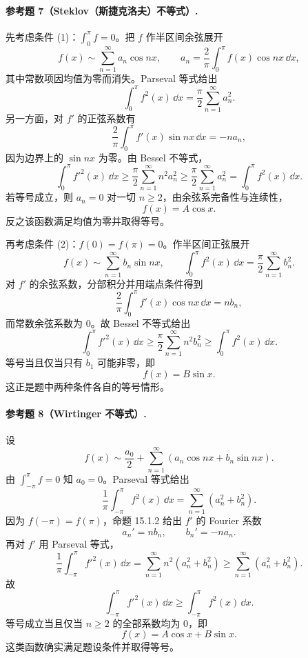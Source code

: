 \paragraph{参考题 7（Steklov（斯捷克洛夫）不等式）.}
\begin{xsolution}
先考虑条件 (1)：$\int_0^\pi f=0$。把 $f$ 作半区间余弦展开
\[
  f(x)\sim\sum_{n=1}^{\infty}a_n\cos nx,
\qquad
  a_n=\frac2\pi\int_0^\pi f(x)\cos nx\,\dd x,
\]
其中常数项因均值为零而消失。Parseval 等式给出
\[
  \int_0^\pi f^2(x)\,\dd x
  =\frac\pi2\sum_{n=1}^{\infty}a_n^2.
\]
另一方面，对 $f'$ 的正弦系数有
\[
  \frac2\pi\int_0^\pi f'(x)\sin nx\,\dd x
  =-n a_n,
\]
因为边界上的 $\sin nx$ 为零。由 Bessel 不等式，
\[
  \int_0^\pi f'^2(x)\,\dd x
  \ge\frac\pi2\sum_{n=1}^{\infty}n^2a_n^2
  \ge\frac\pi2\sum_{n=1}^{\infty}a_n^2
  =\int_0^\pi f^2(x)\,\dd x.
\]
若等号成立，则 $a_n=0$ 对一切 $n\ge2$，由余弦系完备性与连续性，
\[
  f(x)=A\cos x.
\]
反之该函数满足均值为零并取得等号。

再考虑条件 (2)：$f(0)=f(\pi)=0$。作半区间正弦展开
\[
  f(x)\sim\sum_{n=1}^{\infty}b_n\sin nx,
\qquad
  \int_0^\pi f^2(x)\,\dd x=\frac\pi2\sum_{n=1}^{\infty}b_n^2.
\]
对 $f'$ 的余弦系数，分部积分并用端点条件得到
\[
  \frac2\pi\int_0^\pi f'(x)\cos nx\,\dd x=n b_n,
\]
而常数余弦系数为 $0$。故 Bessel 不等式给出
\[
  \int_0^\pi f'^2(x)\,\dd x
  \ge\frac\pi2\sum_{n=1}^{\infty}n^2b_n^2
  \ge\int_0^\pi f^2(x)\,\dd x.
\]
等号当且仅当只有 $b_1$ 可能非零，即
\[
  f(x)=B\sin x.
\]
这正是题中两种条件各自的等号情形。
\end{xsolution}

\paragraph{参考题 8（Wirtinger 不等式）.}
\begin{xsolution}
设
\[
  f(x)\sim\frac{a_0}{2}+\sum_{n=1}^{\infty}(a_n\cos nx+b_n\sin nx).
\]
由 $\int_{-\pi}^{\pi}f=0$ 知 $a_0=0$。Parseval 等式给出
\[
  \frac1\pi\int_{-\pi}^{\pi}f^2(x)\,\dd x
  =\sum_{n=1}^{\infty}(a_n^2+b_n^2).
\]
因为 $f(-\pi)=f(\pi)$，命题 15.1.2 给出 $f'$ 的 Fourier 系数
\[
  a_n'=n b_n,\qquad b_n'=-n a_n.
\]
再对 $f'$ 用 Parseval 等式，
\[
  \frac1\pi\int_{-\pi}^{\pi}f'^2(x)\,\dd x
  =\sum_{n=1}^{\infty}n^2(a_n^2+b_n^2)
  \ge\sum_{n=1}^{\infty}(a_n^2+b_n^2).
\]
故
\[
  \boxed{\displaystyle
  \int_{-\pi}^{\pi}f'^2(x)\,\dd x
  \ge\int_{-\pi}^{\pi}f^2(x)\,\dd x }.
\]
等号成立当且仅当 $n\ge2$ 的全部系数均为 $0$，即
\[
  \boxed{f(x)=A\cos x+B\sin x}.
\]
这类函数确实满足题设条件并取得等号。
\end{xsolution}

